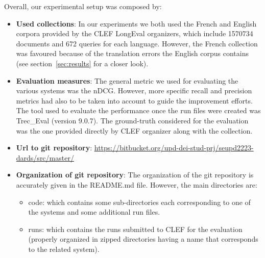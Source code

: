 Overall, our experimental setup was composed by:
\begin{itemize}
	\item \textbf{Used collections}: In our experiments we both used the French and English corpora provided by the CLEF LongEval organizers, which include 1570734 documents and 672 queries for each language. However, the French collection was favoured because of the translation errors the English corpus contains (see section~\ref{sec:results} for a closer look).  
 
	\item \textbf{Evaluation measures}: The general metric we used for evaluating the various systems was the nDCG. However, more specific recall and precision metrics had also to be taken into account to guide the improvement efforts. The tool used to evaluate the performance once the run files were created was Trec\_Eval (version 9.0.7). The ground-truth considered for the evaluation was the one provided directly by CLEF organizer along with the collection.

 
	\item \textbf{Url to git repository}: \href{https://bitbucket.org/upd-dei-stud-prj/seupd2223-dards/src/master/}{https://bitbucket.org/upd-dei-stud-prj/seupd2223-dards/src/master/}



 
        \item \textbf{Organization of git repository}: The organization of the git repository is accurately given in the README.md file. However, the main directories are:
            \begin{itemize}
                \item code: which contains some sub-directories each corresponding to one of the systems and some additional run files.
                \item runs: which contains the runs submitted to CLEF for the evaluation (properly organized in zipped directories having a name that corresponds to the related system).
            \end{itemize}



\end{itemize}
